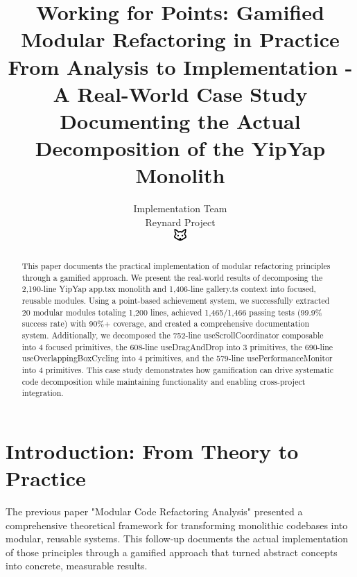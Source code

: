 \documentclass[11pt]{article}
\begin{document}
\title{\textbf{Working for Points: Gamified Modular Refactoring in Practice} \\
\Large{From Analysis to Implementation - A Real-World Case Study} \\
\large{Documenting the Actual Decomposition of the YipYap Monolith}}

\author{Implementation Team\\
Reynard Project\\
\includegraphics[width=0.5cm]{../../shared-assets/favicon.pdf}}

\maketitle

\begin{abstract}
This paper documents the practical implementation of modular refactoring principles through a gamified approach. We present the real-world results of decomposing the 2,190-line YipYap app.tsx monolith and 1,406-line gallery.ts context into focused, reusable modules. Using a point-based achievement system, we successfully extracted 20 modular modules totaling 1,200 lines, achieved 1,465/1,466 passing tests (99.9\% success rate) with 90\%+ coverage, and created a comprehensive documentation system. Additionally, we decomposed the 752-line useScrollCoordinator composable into 4 focused primitives, the 608-line useDragAndDrop into 3 primitives, the 690-line useOverlappingBoxCycling into 4 primitives, and the 579-line usePerformanceMonitor into 4 primitives. This case study demonstrates how gamification can drive systematic code decomposition while maintaining functionality and enabling cross-project integration.
\end{abstract}

\tableofcontents
\newpage

\section{Introduction: From Theory to Practice}

The previous paper "Modular Code Refactoring Analysis" presented a comprehensive theoretical framework for transforming monolithic codebases into modular, reusable systems. This follow-up documents the actual implementation of those principles through a gamified approach that turned abstract concepts into concrete, measurable results.
\end{document}
